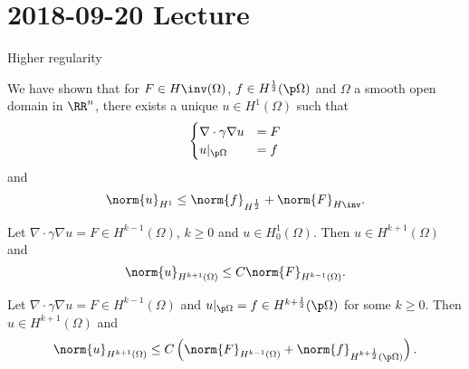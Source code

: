 \section{2018-09-20 Lecture}

Higher regularity

We have shown that for $F \in H\inv(\Omega)$, $f \in H^\frac12(\p\Omega)$ and  $\Omega$ a smooth open domain in $\RR^n$, there exists a unique $u \in H^1(\Omega)$ such that
\begin{equation*}
  \begin{cases}
    \nabla\cdot\gamma\nabla u&=F \\
    u|_{\p\Omega}&=f
  \end{cases}
\end{equation*}
and
\[ \norm{u}_{H^1} \leq \norm{f}_{H^\frac12} + \norm{F}_{H\inv}. \]

\begin{thm}\label{15:thm}
  Let $\nabla\cdot\gamma\nabla u = F\in H^{k-1}(\Omega)$, $k\geq0$ and $u\in H_0^1(\Omega)$.
  Then $u\in H^{k+1}(\Omega)$ and
  \[ \norm{u}_{H^{k+1}(\Omega)} \leq C\norm{F}_{H^{k-1}(\Omega)}. \]
\end{thm}

\begin{exer}
  Let $\nabla\cdot\gamma\nabla u=F \in H^{k-1}(\Omega)$ and $u|_{\p\Omega}=f \in H^{k+\frac12}(\p\Omega)$ for some $k\geq0$.
  Then $u\in H^{k+1}(\Omega)$ and
  \[ \norm{u}_{H^{k+1}(\Omega)} \leq C\left( \norm{F}_{H^{k-1}(\Omega)} + \norm{f}_{H^{k+\frac12}(\p\Omega)} \right). \]
\end{exer}


